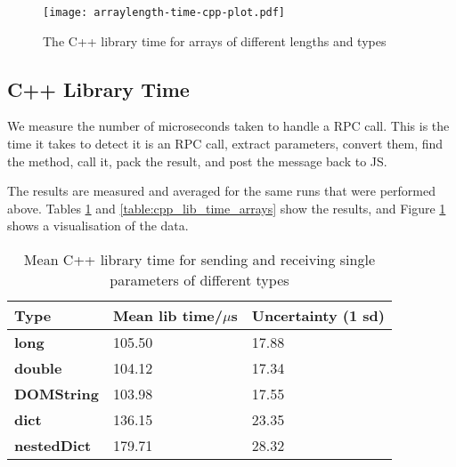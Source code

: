 \begin{figure}
    \centering
    \texttt{[image: arraylength-time-cpp-plot.pdf]} 
    \caption{The C++ library time for arrays of different lengths and types}
    \label{fig:arraylength-time-cpp-plot}
\end{figure}



\subsection{C++ Library Time}\label{c-library-time}

We measure the number of microseconds taken to handle a RPC call. This is the time it takes to detect it is an RPC call, extract parameters, convert them, find the method, call it, pack the result, and post the message back to JS.

The results are measured and averaged for the same runs that were performed above. Tables \ref{table:cpp_lib_time_single_param} and \ref{table:cpp_lib_time_arrays} show the results, and Figure \ref{fig:arraylength-time-cpp-plot} shows a visualisation of the data.


\begin{table}[h]
\begin{tabular}{l|ll}
\textbf{Type}       & \textbf{Mean lib time/$\mu$s} & \textbf{Uncertainty (1 sd)} \\ \hline
\textbf{long}       & 105.50                    & 17.88                       \\
\textbf{double}     & 104.12                    & 17.34                       \\
\textbf{DOMString}  & 103.98                    & 17.55                       \\
\textbf{dict}       & 136.15                    & 23.35                       \\
\textbf{nestedDict} & 179.71                    & 28.32                      
\end{tabular}
\caption{Mean C++ library time for sending and receiving single parameters of different types}
\label{table:cpp_lib_time_single_param}
\end{table}


